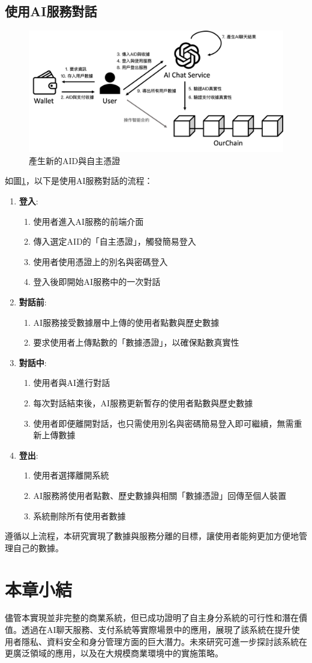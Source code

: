 \subsection{使用AI服務對話}
\begin{figure}
  \centering
  \includegraphics[width=\linewidth, keepaspectratio]{figures/implement-3.png}
  \caption{產生新的AID與自主憑證}
  \label{fig:implement-3}
\end{figure}
如圖\ref{fig:implement-3}，以下是使用AI服務對話的流程：
\begin{enumerate}
  \item \textbf{登入}:
        \begin{enumerate}
          \item 使用者進入AI服務的前端介面
          \item 傳入選定AID的「自主憑證」，觸發簡易登入
          \item 使用者使用憑證上的別名與密碼登入
          \item 登入後即開始AI服務中的一次對話
        \end{enumerate}
  \item \textbf{對話前}:
        \begin{enumerate}
          \item AI服務接受數據層中上傳的使用者點數與歷史數據
          \item 要求使用者上傳點數的「數據憑證」，以確保點數真實性
        \end{enumerate}
  \item \textbf{對話中}:
        \begin{enumerate}
          \item 使用者與AI進行對話
          \item 每次對話結束後，AI服務更新暫存的使用者點數與歷史數據
          \item 使用者即便離開對話，也只需使用別名與密碼簡易登入即可繼續，無需重新上傳數據
        \end{enumerate}
  \item \textbf{登出}:
        \begin{enumerate}
          \item 使用者選擇離開系統
          \item AI服務將使用者點數、歷史數據與相關「數據憑證」回傳至個人裝置
          \item 系統刪除所有使用者數據
        \end{enumerate}
\end{enumerate}
遵循以上流程，本研究實現了數據與服務分離的目標，讓使用者能夠更加方便地管理自己的數據。
\section{本章小結}
儘管本實現並非完整的商業系統，但已成功證明了自主身分系統的可行性和潛在價值。透過在AI聊天服務、支付系統等實際場景中的應用，展現了該系統在提升使用者隱私、資料安全和身分管理方面的巨大潛力。未來研究可進一步探討該系統在更廣泛領域的應用，以及在大規模商業環境中的實施策略。